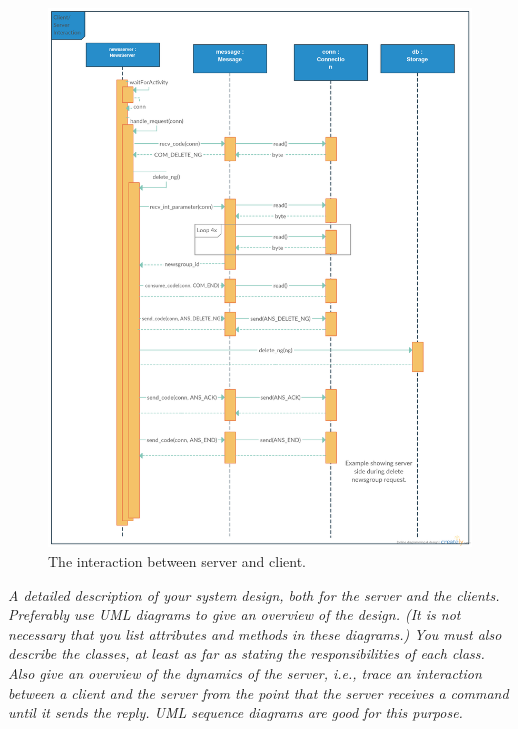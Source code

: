 \documentclass[a4paper]{article}
\begin{document}
\begin{figure}[!h]
    \centering
    \includegraphics[width=1.25\textwidth]{sequence_uml3.png}
    \caption{The interaction between server and client.}
    \label{fig:sequence}
\end{figure}

\emph{A detailed description of your system design, both for the server and the clients. Preferably
use UML diagrams to give an overview of the design. (It is not necessary that you list
attributes and methods in these diagrams.) You must also describe the classes, at least as
far as stating the responsibilities of each class.
Also give an overview of the dynamics of the server, i.e., trace an interaction between a
client and the server from the point that the server receives a command until it sends the
reply. UML sequence diagrams are good for this purpose.}
\end{document}
